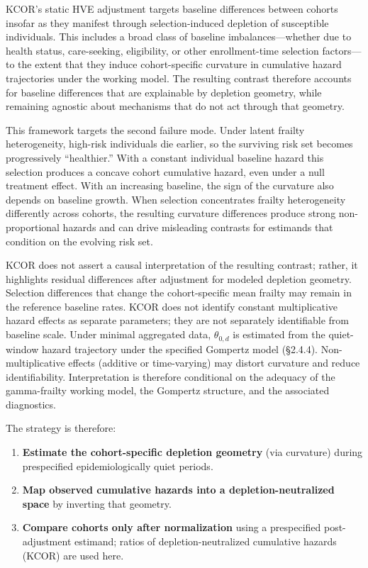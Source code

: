 \documentclass[
]{article}
\providecommand{\tightlist}{%
  \setlength{\itemsep}{0pt}\setlength{\parskip}{0pt}}
\begin{document}
KCOR's static HVE adjustment targets baseline differences between cohorts insofar as they manifest through selection-induced depletion of susceptible individuals. This includes a broad class of baseline imbalances---whether due to health status, care-seeking, eligibility, or other enrollment-time selection factors---to the extent that they induce cohort-specific curvature in cumulative hazard trajectories under the working model. The resulting contrast therefore accounts for baseline differences that are explainable by depletion geometry, while remaining agnostic about mechanisms that do not act through that geometry.

This framework targets the second failure mode. Under latent frailty heterogeneity, high-risk individuals die earlier, so the surviving risk set becomes progressively ``healthier.'' With a constant individual baseline hazard this selection produces a concave cohort cumulative hazard, even under a null treatment effect. With an increasing baseline, the sign of the curvature also depends on baseline growth. When selection concentrates frailty heterogeneity differently across cohorts, the resulting curvature differences produce strong non-proportional hazards and can drive misleading contrasts for estimands that condition on the evolving risk set.

KCOR does not assert a causal interpretation of the resulting contrast; rather, it highlights residual differences after adjustment for modeled depletion geometry. Selection differences that change the cohort-specific mean frailty may remain in the reference baseline rates. KCOR does not identify constant multiplicative hazard effects as separate parameters; they are not separately identifiable from baseline scale. Under minimal aggregated data, \(\theta_{0,d}\) is estimated from the quiet-window hazard trajectory under the specified Gompertz model (§2.4.4). Non-multiplicative effects (additive or time-varying) may distort curvature and reduce identifiability. Interpretation is therefore conditional on the adequacy of the gamma-frailty working model, the Gompertz structure, and the associated diagnostics.

The strategy is therefore:

\begin{enumerate}
\def\labelenumi{\arabic{enumi}.}
\tightlist
\item
  \textbf{Estimate the cohort-specific depletion geometry} (via curvature) during prespecified epidemiologically quiet periods.
\item
  \textbf{Map observed cumulative hazards into a depletion-neutralized space} by inverting that geometry.
\item
  \textbf{Compare cohorts only after normalization} using a prespecified post-adjustment estimand; ratios of depletion-neutralized cumulative hazards (KCOR) are used here.
\end{enumerate}
\end{document}
